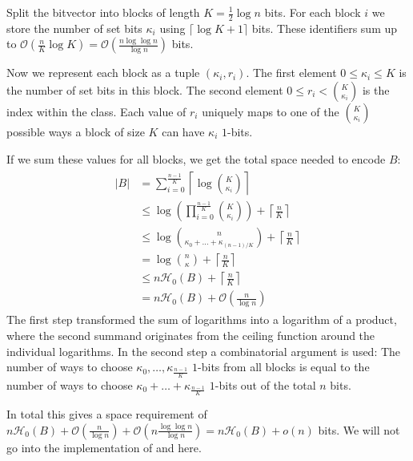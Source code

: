 \begin{Proof}
  Split the bitvector into blocks of length $K = \frac{1}{2}\log n$ bits. For each block $i$ we store the number of set bits $\kappa_i$ using $\lceil \log K + 1\rceil$ bits. These identifiers sum up to $\mathcal{O}\left(\frac{n}{K}\log K\right) = \mathcal{O}\left(\frac{n \log\log n}{\log n}\right)$ bits.

  Now we represent each block as a tuple $(\kappa_i,r_i)$. The first element $0 \leq \kappa_i \leq K$ is the number of set bits in this block. The second element $0 \leq r_i < \binom{K}{\kappa_i}$ is the index within the class. Each value of $r_i$ uniquely maps to one of the $\binom{K}{\kappa_i}$ possible ways a block of size $K$ can have $\kappa_i$ $1$-bits.

  If we sum these values for all blocks, we get the total space needed to encode $B$:
  \begin{align}
    \begin{aligned}
      \vert B \vert
      &= \sum\limits_{i=0}^\frac{n-1}{K} \left\lceil\log\binom{K}{\kappa_i}\right\rceil \\
      &\leq \log\left(\prod\limits_{i=0}^{\frac{n-1}{K}}\binom{K}{\kappa_i}\right) + \left\lceil\frac{n}{K}\right\rceil \\
      &\leq \log\binom{n}{\kappa_0 + \ldots + \kappa_{(n-1)/K}} + \left\lceil\frac{n}{K}\right\rceil \\
      &= \log\binom{n}{\kappa}  + \left\lceil\frac{n}{K}\right\rceil\\
      &\leq n\mathcal{H}_0(B) + \left\lceil\frac{n}{K}\right\rceil \\
      &= n\mathcal{H}_0(B) + \mathcal{O}\left(\frac{n}{\log n}\right)
    \end{aligned}
  \end{align}
  The first step transformed the sum of logarithms into a logarithm of a product, where the second summand originates from the ceiling function around the individual logarithms. In the second step a combinatorial argument is used: The number of ways to choose $\kappa_0, \ldots, \kappa_{\frac{n-1}{K}}$ $1$-bits from all blocks is equal to the number of ways to choose $\kappa_0 + \ldots + \kappa_{\frac{n-1}{K}}$ $1$-bits out of the total $n$ bits.

  In total this gives a space requirement of $n\mathcal{H}_0(B) + \mathcal{O}\left(\frac{n}{\log n}\right) + \mathcal{O}\left(n\frac{\log\log n}{\log n}\right) = n\mathcal{H}_0(B) + o(n)$ bits. We will not go into the implementation of  and  here.
\end{Proof}

